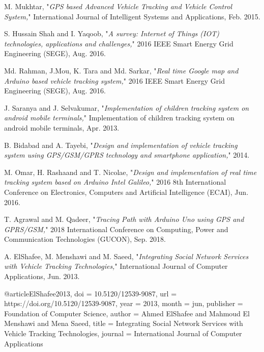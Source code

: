 \cleardoublepage
{}
{}
\begin{thebibliography}{99}
	
	M. Mukhtar, "\textit{{GPS} based Advanced Vehicle Tracking and Vehicle Control System,}" International Journal of Intelligent Systems and Applications, Feb. 2015.
	
	S. Hussain Shah and I. Yaqoob, "\textit{A survey: Internet of Things ({IOT}) technologies,  applications and challenges,}" 2016 {IEEE} Smart Energy Grid Engineering ({SEGE}), Aug. 2016.
	
	
	Md. Rahman, J.Mou, K. Tara and Md. Sarkar, "\textit{Real time Google map and Arduino based vehicle tracking system,}" 2016 {IEEE} Smart Energy Grid Engineering ({SEGE}), Aug. 2016.
	
	
	J. Saranya and J. Selvakumar, "\textit{Implementation of children tracking system on android mobile terminals,}" Implementation of children tracking system on android mobile terminals, Apr. 2013.
	
	B. Bidabad and A. Tayebi, "\textit{Design and implementation of vehicle tracking system using GPS/GSM/GPRS technology and smartphone application,}" 2014.
	
	M. Omar, H. Rashaand and T. Nicolae, "\textit{Design and implementation of real time tracking system based on Arduino Intel Galileo,}" 2016 8th International Conference on Electronics,  Computers and Artificial Intelligence ({ECAI}), Jun. 2016.

	T. Agrawal and M. Qadeer, "\textit{Tracing Path with Arduino Uno using {GPS} and {GPRS}/{GSM},}" 2018 International Conference on Computing,  Power and Communication Technologies ({GUCON}), Sep. 2018.
	
	A. ElShafee, M. Menshawi and M. Saeed, "\textit{Integrating Social Network Services with Vehicle Tracking Technologies,}" International Journal of Computer Applications, Jun. 2013.
	
	@article{ElShafee2013,
		doi = {10.5120/12539-9087},
		url = {https://doi.org/10.5120/12539-9087},
		year = {2013},
		month = jun,
		publisher = {Foundation of Computer Science},
		author = {Ahmed ElShafee and Mahmoud El Menshawi and Mena Saeed},
		title = {Integrating Social Network Services with Vehicle Tracking Technologies},
		journal = {International Journal of Computer Applications}
	}
	
\end{thebibliography}